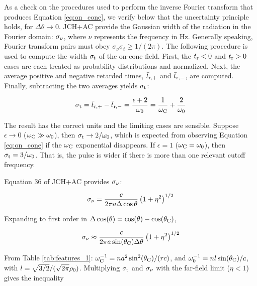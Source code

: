 \documentclass[amsmath,amssymb,aps,prd,10pt,twocolumn]{revtex4}
\begin{document}
As a check on the procedures used to perform the inverse Fourier transform that produces Equation \ref{eq:on_cone}, we verify below that the uncertainty principle holds, for $\Delta\theta \to 0$.  JCH+AC provide the Gaussian width of the radiation in the Fourier domain: $\sigma_{\rm \nu}$, where $\nu$ represents the frequency in Hz.  Generally speaking, Fourier transform pairs must obey $\sigma_\nu \sigma_t \geq 1/(2\pi)$.  The following procedure is used to compute the width $\sigma_{\rm t}$ of the on-cone field.  First, the $t_{\rm r} < 0$ and $t_{\rm r} > 0$ cases are each treated as probability distributions and normalized.  Next, the average positive and negative retarded times, $\bar{t}_{\rm r,+}$ and $\bar{t}_{\rm r,-}$, are computed.  Finally, subtracting the two averages yields $\sigma_{\rm t}$:

\begin{equation}
\sigma_{\rm t} = \bar{t}_{\rm r,+} - \bar{t}_{\rm r,-} = \frac{\epsilon+2}{\omega_{\rm 0}} = \frac{1}{\omega_{\rm C}} + \frac{2}{\omega_{\rm 0}} \label{eq:width_oncone}
\end{equation}

The result has the correct units and the limiting cases are sensible.  Suppose $\epsilon \to 0$ ($\omega_{\rm C} \gg \omega_{\rm 0}$), then $\sigma_{\rm t} \to 2/\omega_{\rm 0}$, which is expected from observing Equation \ref{eq:on_cone} if the $\omega_{\rm C}$ exponential disappears.  If $\epsilon = 1$ ($\omega_{\rm C} = \omega_{\rm 0}$), then $\sigma_{\rm t} = 3/\omega_{\rm 0}$.  That is, the pulse is wider if there is more than one relevant cutoff frequency.

Equation 36 of JCH+AC \cite{10.1016/j.astropartphys.2017.03.008} provides $\sigma_{\rm \nu}$:

\begin{equation}
\sigma_{\rm \nu} = \frac{c}{2\pi a \Delta\cos\theta}\left(1+\eta^2\right)^{1/2} \label{eq:sigmanu}
\end{equation}

Expanding to first order in $\Delta\cos(\theta) = \cos(\theta) - \cos(\theta_{\rm C})$,

\begin{equation}
\sigma_{\rm \nu} \approx \frac{c}{2\pi a \sin(\theta_{\rm C}) \Delta\theta}\left(1+\eta^2\right)^{1/2} \label{eq:sigmanu2}
\end{equation}

From Table \ref{tab:features_1}: $\omega_{\rm C}^{-1} = n a^2 \sin^2(\theta_{\rm C})/(rc)$, and $\omega_{\rm 0}^{-1} = n l \sin(\theta_{\rm C})/c$, with $l = \sqrt{3/2}/(\sqrt{2\pi} \rho_{\rm 0})$.  Multiplying $\sigma_{\rm t}$ and $\sigma_{\rm \nu}$ with the far-field limit ($\eta < 1$) gives the inequality
\end{document}
